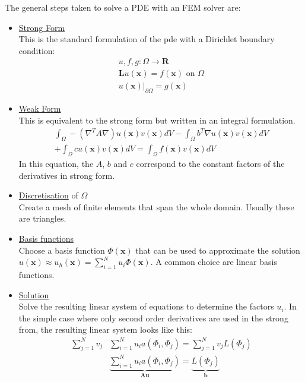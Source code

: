 \documentclass[./\jobname.tex]{subfiles}
\begin{document}
The general steps taken to solve a PDE with an FEM solver are: 
\begin{itemize}
	\item \underline{Strong Form} \\
		  This is the standard formulation of the \gls{pde} with a Dirichlet boundary condition: \\
		  \begin{equation}
			  \begin{split}
			  	u, f, g: \Omega \rightarrow \mathbf{R} \\
				\mathbf{L} u(\mathbf{x}) = f(\mathbf{x}) \text{ on $\Omega$} \\
				u(\mathbf{x})|_{\partial \Omega} = g(\mathbf{x})
			  \end{split}
		  \end{equation}
	\item \underline{Weak Form} \\
		  This is equivalent to the strong form but written in an integral formulation. \\
		  \begin{equation}
			  \begin{split}
			      \int_{\Omega} - (\nabla^T A \nabla) u(\mathbf{x}) v(\mathbf{x}) dV - \int_{\Omega} b^T \nabla u(\mathbf{x}) v(\mathbf{x}) dV \\
			      + \int_{\Omega} c u(\mathbf{x}) v(\mathbf{x}) dV = \int_{\Omega} f(\mathbf{x}) v(\mathbf{x}) dV
			  \end{split}
		  \end{equation}
		  In this equation, the $A$, $b$ and $c$ correspond to the constant factors of the derivatives in strong form. 
	\item \underline{Discretisation} of $\Omega$ \\
		  Create a mesh of finite elements that span the whole domain. Usually these are triangles. 
	\item \underline{Basis functions} \\
		  Choose a basis function $\Phi(\mathbf{x})$ that can be used to approximate the solution $u(\mathbf{x}) \approx u_{h}(\mathbf{x}) = \sum_{i = 1}^{N} u_i \Phi(\mathbf{x})$. A common choice are linear basis functions. 
	\item \underline{Solution} \\
		  Solve the resulting linear system of equations to determine the factors $u_i$. In the simple case where only second order derivatives are used in the strong from, the resulting linear system looks like this: 
		  \begin{equation}
		  \begin{split}
		  \sum_{j=1}^{N} v_j & \sum_{i=1}^{N} u_i a(\Phi_i, \Phi_j) = \sum_{j=1}^{N} v_j L(\Phi_j) \\
		  & \underbrace{\sum_{i=1}^{N} u_i a(\Phi_i, \Phi_j)}_{\mathbf{A u}} = \underbrace{L(\Phi_j)}_{\mathbf{b}}
		  \end{split}
		  \end{equation}
\end{itemize}
\end{document}
